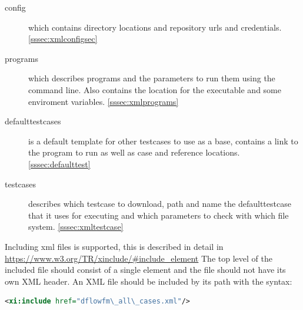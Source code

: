 \documentclass{deltares_memo}
\begin{document}
\begin{description}
\item[config] which contains directory locations and repository urls and credentials. \autoref{sssec:xmlconfigsec}
\item[programs] which describes programs and the parameters to run them using the command line. Also contains the location for the executable and some enviroment variables. \autoref{sssec:xmlprograms}
\item[defaulttestcases] is a default template for other testcases to use as a base, contains a link to the program to run as well as case and reference locations. \autoref{sssec:defaulttest}
\item[testcases] describes which testcase to download, path and name the defaulttestcase that it uses for executing and which parameters to check with which file system. \autoref{sssec:xmltestcase}
\end{description}
Including xml files is supported, this is described in detail in \url{https://www.w3.org/TR/xinclude/\#include\_element} The top level of the included file should consist of a single element and the file should not have its own XML header. An XML file should be included by its path with the syntax:
\begin{lstlisting}[language=XML]
<xi:include href="dflowfm\_all\_cases.xml"/>
\end{lstlisting}

\newpage
\end{document}
